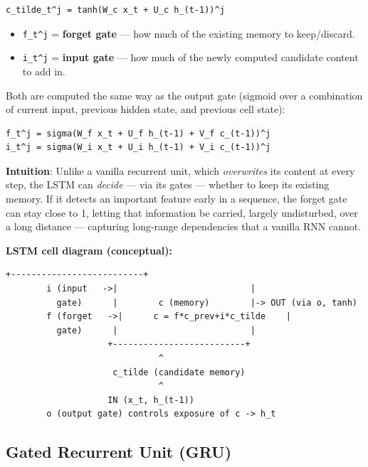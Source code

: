 \documentclass[12pt,openany]{book}
\theoremstyle{definition}
\theoremstyle{remark}
\begin{document}
\begin{lstlisting}[style=notesCode]
c_tilde_t^j = tanh(W_c x_t + U_c h_(t-1))^j
\end{lstlisting}

\begin{itemize}
\item \texttt{f\_t\textasciicircum{}j} = \textbf{forget gate} --- how much of the existing memory to keep/discard.
\item \texttt{i\_t\textasciicircum{}j} = \textbf{input gate} --- how much of the newly computed candidate content to add in.

\end{itemize}
Both are computed the same way as the output gate (sigmoid over a combination of current input, previous hidden state, and previous cell state):

\begin{lstlisting}[style=notesCode]
f_t^j = sigma(W_f x_t + U_f h_(t-1) + V_f c_(t-1))^j
i_t^j = sigma(W_i x_t + U_i h_(t-1) + V_i c_(t-1))^j
\end{lstlisting}

\textbf{Intuition}: Unlike a vanilla recurrent unit, which \emph{overwrites} its content at every step, the LSTM can \emph{decide} --- via its gates --- whether to keep its existing memory. If it detects an important feature early in a sequence, the forget gate can stay close to 1, letting that information be carried, largely undisturbed, over a long distance --- capturing long-range dependencies that a vanilla RNN cannot.

\textbf{LSTM cell diagram (conceptual):}

\begin{lstlisting}[style=notesCode]
                    +--------------------------+
        i (input   ->|                          |
          gate)      |        c (memory)        |-> OUT (via o, tanh)
        f (forget   ->|      c = f*c_prev+i*c_tilde    |
          gate)      |                          |
                    +--------------------------+
                              ^
                     c_tilde (candidate memory)
                              ^
                    IN (x_t, h_(t-1))
        o (output gate) controls exposure of c -> h_t
\end{lstlisting}

\subsection{Gated Recurrent Unit (GRU)}
\end{document}
